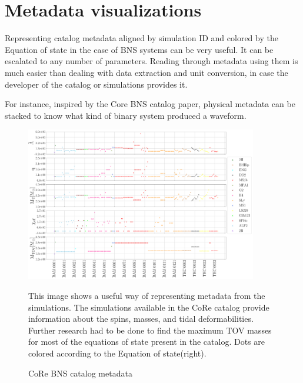 \chapter{Metadata visualizations}\label{layer}

Representing catalog metadata aligned by simulation ID and colored by the Equation of state in the case of BNS systems can be very useful. It can be escalated to any number of parameters. Reading through metadata using them is much easier than dealing with data extraction and unit conversion, in case the developer of the catalog or simulations provides it. 

For instance, inspired by the Core BNS catalog paper, physical metadata can be stacked to know what kind of binary system produced a waveform.


\begin{figure}[hbt!]
\begin{center}
\includegraphics[width=0.9\textwidth, angle=0]{images/Data_analysis/results/CORE_cat.pdf} 
\caption{CoRe BNS catalog metadata}
\end{center}
This image shows a useful way of representing metadata from the simulations. The simulations available in the CoRe catalog\cite{Dietrich:2018phi} provide information about the spins, masses, and tidal deformabilities. Further research had to be done to find the maximum TOV masses for most of the equations of state present in the catalog. Dots are colored according to the Equation of state(right).
\label{corecat}
\end{figure}


